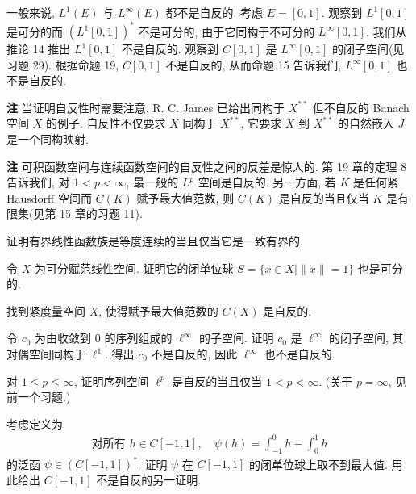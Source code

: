 \documentclass[../../main.tex]{subfiles}
\begin{document}
一般来说, $L^{1}(E)$ 与 $L^{\infty}(E)$ 都不是自反的. 考虑 $E=[0,1]$. 观察到 $L^{1}[0,1]$ 是可分的而 $(L^{1}[0,1])^{*}$ 不是可分的, 由于它同构于不可分的 $L^{\infty}[0,1]$. 我们从推论 14 推出 $L^{1}[0,1]$ 不是自反的. 观察到 $C[0,1]$ 是 $L^{\infty}[0,1]$ 的闭子空间(见习题 29). 根据命题 19, $C[0,1]$ 不是自反的, 从而命题 15 告诉我们, $L^{\infty}[0,1]$ 也不是自反的.

\textbf{注} 当证明自反性时需要注意. R. C. James 已给出同构于 $X^{**}$ 但不自反的 Banach 空间 $X$ 的例子. 自反性不仅要求 $X$ 同构于 $X^{**}$, 它要求 $X$ 到 $X^{**}$ 的自然嵌入 $J$ 是一个同构映射.

\textbf{注} 可积函数空间与连续函数空间的自反性之间的反差是惊人的. 第 19 章的定理 8 告诉我们, 对 $1<p<\infty$, 最一般的 $L^{p}$ 空间是自反的. 另一方面, 若 $K$ 是任何紧 Hausdorff 空间而 $C(K)$ 赋予最大值范数, 则 $C(K)$ 是自反的当且仅当 $K$ 是有限集(见第 15 章的习题 11).

\begin{exercise}\label{exercise:ch14-31}
证明有界线性函数族是等度连续的当且仅当它是一致有界的.
\end{exercise}

\begin{exercise}\label{exercise:ch14-32}
令 $X$ 为可分赋范线性空间. 证明它的闭单位球 $S=\{x\in X\mid\|x\|=1\}$ 也是可分的.
\end{exercise}

\begin{exercise}\label{exercise:ch14-33}
找到紧度量空间 $X$, 使得赋予最大值范数的 $C(X)$ 是自反的.
\end{exercise}

\begin{exercise}\label{exercise:ch14-34}
令 $c_{0}$ 为由收敛到 $0$ 的序列组成的 $\ell^{\infty}$ 的子空间. 证明 $c_{0}$ 是 $\ell^{\infty}$ 的闭子空间, 其对偶空间同构于 $\ell^{1}$. 得出 $c_{0}$ 不是自反的, 因此 $\ell^{\infty}$ 也不是自反的.
\end{exercise}

\begin{exercise}\label{exercise:ch14-35}
对 $1\leqslant p\leqslant\infty$, 证明序列空间 $\ell^{p}$ 是自反的当且仅当 $1<p<\infty$. (关于 $p=\infty$, 见前一个习题.)
\end{exercise}

\begin{exercise}\label{exercise:ch14-36}
考虑定义为
\begin{align*}
\text{对所有 }h\in C[-1,1],\quad\psi(h)=\int_{-1}^{0}h-\int_{0}^{1}h
\end{align*}
的泛函 $\psi\in(C[-1,1])^{*}$. 证明 $\psi$ 在 $C[-1,1]$ 的闭单位球上取不到最大值. 用此给出 $C[-1,1]$ 不是自反的另一证明.
\end{exercise}
\end{document}
